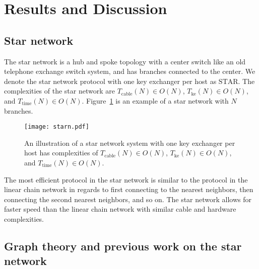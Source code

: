 \documentclass[a4paper,12pt,pdftex]{article}
\begin{document}
\section{Results and Discussion}


\subsection{Star network}

The star network is a hub and spoke topology with a center switch like an old telephone exchange switch system, and has branches connected to the center. We denote the star network protocol with one key exchanger per host as $\mathrm{STAR}$. The complexities of the star network are $T_\mathrm{cable}(N) \in O(N)$, $T_\mathrm{ke}(N) \in O(N)$, and $T_\mathrm{time}(N) \in O(N)$. Figure~\ref{fig:starn} is an example of a star network with $N$ branches.

\begin{figure}[h]
    \caption{An illustration of a star network system with one key exchanger per host has complexities of $T_\mathrm{cable}(N) \in O(N)$, $T_\mathrm{ke}(N) \in O(N)$, and $T_\mathrm{time}(N) \in O(N)$. }
    \label{fig:starn}
  \centering
\texttt{[image: starn.pdf]}
\end{figure}

The most efficient protocol in the star network is similar to the protocol in the linear chain network in regards to first connecting to the nearest neighbors, then connecting the second nearest neighbors, and so on. The star network allows for faster speed than the linear chain network with similar cable and hardware complexities.

\subsection{Graph theory and previous work on the star network}
\end{document}
